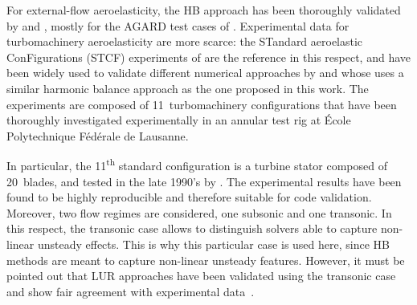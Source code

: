 
For external-flow aeroelasticity, the HB approach has 
been thoroughly validated by \citet{Gopinath2005, Woodgate2009} and \citet{JDufour2009}, 
mostly for the AGARD test cases of \citet{Davis1982}.
Experimental data for turbomachinery aeroelasticity are more scarce: 
the STandard aeroelastic ConFigurations (STCF) experiments 
of \citet{Fransson1999} are the 
reference in this respect, and have been widely used 
to validate different numerical approaches by \citet{Sbardella2001,
Duta2002,Campobasso2003,Cinnella2004} and \citet{Huang2013a} whose
uses a similar harmonic balance approach as the one proposed in
this work.
The experiments
are composed of 11~turbomachinery configurations that have been
thoroughly investigated experimentally in an 
annular test rig at \'Ecole 
Polytechnique F\'ed\'erale de Lausanne.

In particular, the 11\textsuperscript{th} standard configuration is a
turbine stator composed of 20~blades, and tested
in the late 1990's by \citet{Fransson1999}.
The experimental results have been found to be highly reproducible and
therefore suitable for code validation.  Moreover,
two flow regimes are considered, one subsonic and one transonic.
In this respect, the transonic case allows to distinguish
solvers able to capture non-linear unsteady effects. This is why this particular
case is used here, since HB methods are meant to capture non-linear unsteady
features. However, it must be pointed out that LUR approaches have
been validated using the transonic case and show fair agreement with experimental
data~\cite{Sbardella2001, Duta2002,Campobasso2003}.


